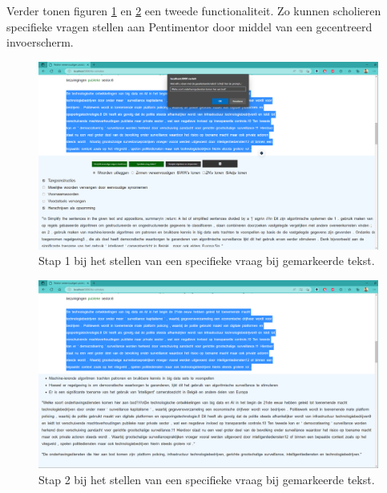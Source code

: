 Verder tonen figuren \ref{img:step-1-proto-vraagstelling} en \ref{img:step-2-proto-vraagstelling} een tweede functionaliteit. Zo kunnen scholieren specifieke vragen stellen aan Pentimentor door middel van een gecentreerd invoerscherm.

\begin{center}
	\begin{figure}[H]
		\includegraphics[width=\linewidth]{img/proto-vraagstelling-1.png}
		\caption{Stap 1 bij het stellen van een specifieke vraag bij gemarkeerde tekst.}
		\label{img:step-1-proto-vraagstelling}
	\end{figure}
\end{center}

\begin{center}
	\begin{figure}[H]
		\includegraphics[width=\linewidth]{img/proto-vraagstelling-2.png}
		\caption{Stap 2 bij het stellen van een specifieke vraag bij gemarkeerde tekst.}
		\label{img:step-2-proto-vraagstelling}
	\end{figure}
\end{center}

